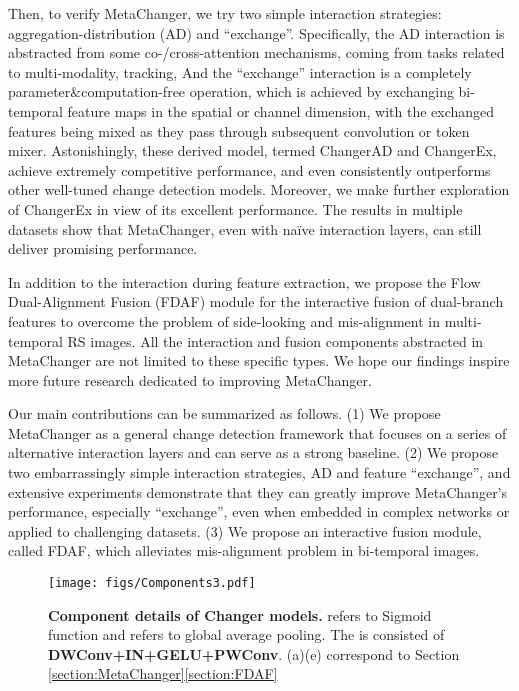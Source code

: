 \documentclass[10pt,twocolumn,letterpaper]{article}
\begin{document}
Then, to verify MetaChanger, we try two simple interaction strategies: aggregation-distribution (AD) and ``exchange''. Specifically, the AD interaction is abstracted from some co-/cross-attention mechanisms, coming from tasks related to multi-modality, tracking, \etc 
And the ``exchange'' interaction is a completely parameter\&computation-free operation, which is achieved by exchanging bi-temporal feature maps in the spatial or channel dimension, with the exchanged features being mixed as they pass through subsequent convolution or token mixer. Astonishingly, these derived model, termed ChangerAD and ChangerEx, achieve extremely competitive performance, and even consistently outperforms other well-tuned change detection models. Moreover, we make further exploration of ChangerEx in view of its excellent performance. The results in multiple datasets show that MetaChanger, even with naïve interaction layers, can still deliver promising performance.

In addition to the interaction during feature extraction, we propose the Flow Dual-Alignment Fusion (FDAF) module for the interactive fusion of dual-branch features to overcome the problem of side-looking and mis-alignment in multi-temporal RS images. All the interaction and fusion components abstracted in MetaChanger are not limited to these specific types. We hope our findings inspire more future research dedicated to improving MetaChanger.

Our main contributions can be summarized as follows.
(1) We propose MetaChanger as a general change detection framework that focuses on a series of alternative interaction layers and can serve as a strong baseline. (2) We propose two embarrassingly simple interaction strategies, AD and feature ``exchange'', and extensive experiments demonstrate that they can greatly improve MetaChanger's performance, especially ``exchange'', even when embedded in complex networks or applied to challenging datasets. (3) We propose an interactive fusion module, called FDAF, which alleviates mis-alignment problem in bi-temporal images.

\begin{figure*}[t]
  \centering
\texttt{[image: figs/Components3.pdf]}
   \caption{\textbf{Component details of Changer models.}  refers to Sigmoid function and  refers to global average pooling. The \bm{} is consisted of \textbf{DWConv+IN+GELU+PWConv}. (a)(e) correspond to Section \ref{section:MetaChanger}\ref{section:FDAF}}
   \label{fig:Components}
\end{figure*}
\end{document}
